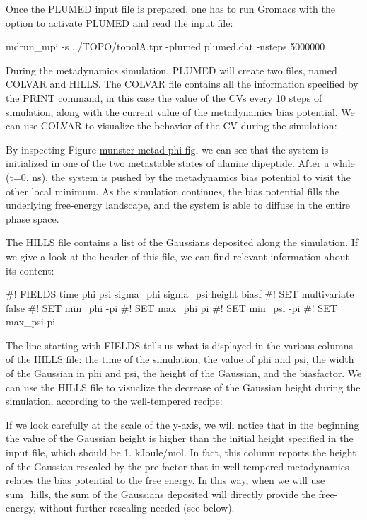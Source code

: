 Once the P\+L\+U\+M\+E\+D input file is prepared, one has to run Gromacs with the option to activate P\+L\+U\+M\+E\+D and read the input file\+:

\begin{DoxyVerb}mdrun_mpi -s ../TOPO/topolA.tpr -plumed plumed.dat -nsteps 5000000
\end{DoxyVerb}


During the metadynamics simulation, P\+L\+U\+M\+E\+D will create two files, named C\+O\+L\+V\+A\+R and H\+I\+L\+L\+S. The C\+O\+L\+V\+A\+R file contains all the information specified by the P\+R\+I\+N\+T command, in this case the value of the C\+Vs every 10 steps of simulation, along with the current value of the metadynamics bias potential. We can use C\+O\+L\+V\+A\+R to visualize the behavior of the C\+V during the simulation\+:

\label{munster_munster-metad-phi-fig}%
\hypertarget{munster_munster-metad-phi-fig}{}%
 By inspecting Figure \hyperlink{munster_munster-metad-phi-fig}{munster-\/metad-\/phi-\/fig}, we can see that the system is initialized in one of the two metastable states of alanine dipeptide. After a while (t=0. ns), the system is pushed by the metadynamics bias potential to visit the other local minimum. As the simulation continues, the bias potential fills the underlying free-\/energy landscape, and the system is able to diffuse in the entire phase space.

The H\+I\+L\+L\+S file contains a list of the Gaussians deposited along the simulation. If we give a look at the header of this file, we can find relevant information about its content\+:

\begin{DoxyVerb}#! FIELDS time phi psi sigma_phi sigma_psi height biasf
#! SET multivariate false
#! SET min_phi -pi
#! SET max_phi pi
#! SET min_psi -pi
#! SET max_psi pi
\end{DoxyVerb}


The line starting with F\+I\+E\+L\+D\+S tells us what is displayed in the various columns of the H\+I\+L\+L\+S file\+: the time of the simulation, the value of phi and psi, the width of the Gaussian in phi and psi, the height of the Gaussian, and the biasfactor. We can use the H\+I\+L\+L\+S file to visualize the decrease of the Gaussian height during the simulation, according to the well-\/tempered recipe\+:

\label{munster_munster-metad-phihills-fig}%
\hypertarget{munster_munster-metad-phihills-fig}{}%
 If we look carefully at the scale of the y-\/axis, we will notice that in the beginning the value of the Gaussian height is higher than the initial height specified in the input file, which should be 1. k\+Joule/mol. In fact, this column reports the height of the Gaussian rescaled by the pre-\/factor that in well-\/tempered metadynamics relates the bias potential to the free energy. In this way, when we will use \hyperlink{sum_hills}{sum\+\_\+hills}, the sum of the Gaussians deposited will directly provide the free-\/energy, without further rescaling needed (see below).

